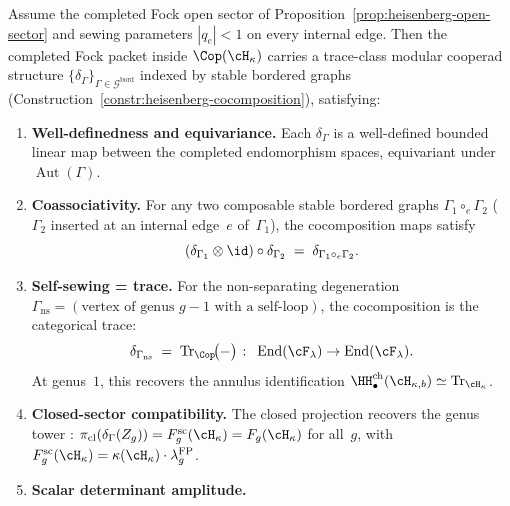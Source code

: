 \begin{theorem}
\label{thm:heisenberg-modular-cooperad}
\label{thm:ct2-heisenberg}
Assume the completed Fock open sector of
Proposition~\ref{prop:heisenberg-open-sector} and sewing parameters
$|q_e|<1$ on every internal edge. Then the completed Fock packet inside
$\Cop(\cH_\kappa)$ carries a trace-class modular cooperad structure
$\{\delta_\Gamma\}_{\Gamma \in \mathcal{G}^{\mathrm{bord}}}$
indexed by stable bordered graphs
\textup{(}Construction~\textup{\ref{constr:heisenberg-cocomposition}}\textup{)},
satisfying:
\begin{enumerate}[label=\textup{(\Roman*)}]
\item \textbf{Well-definedness and equivariance.}
 Each $\delta_\Gamma$ is a well-defined bounded linear map between
 the completed endomorphism spaces, equivariant under
 $\operatorname{Aut}(\Gamma)$.
\item \textbf{Coassociativity.}
 For any two composable stable bordered graphs
 $\Gamma_1 \circ_e \Gamma_2$ \textup{(}$\Gamma_2$ inserted at an
 internal edge~$e$ of~$\Gamma_1$\textup{)}, the cocomposition maps
 satisfy
 \begin{equation}\label{eq:heisenberg-coassociativity}
 (\delta_{\Gamma_1} \otimes \id)
 \circ \delta_{\Gamma_2}
 \;=\;
 \delta_{\Gamma_1 \circ_e \Gamma_2}.
 \end{equation}
\item \textbf{Self-sewing = trace.}
 For the non-separating degeneration
 $\Gamma_{\mathrm{ns}} = (\text{vertex of genus } g{-}1
 \text{ with a self-loop})$, the cocomposition is the categorical
 trace:
 \begin{equation}\label{eq:heisenberg-self-sewing}
 \delta_{\Gamma_{\mathrm{ns}}}
 \;=\;
 \operatorname{Tr}_{\Cop}\!\bigl(-\bigr)
 \;\colon\;
 \operatorname{End}(\cF_\lambda)
 \to
 \operatorname{End}(\cF_\lambda).
 \end{equation}
 At genus~$1$, this recovers the annulus identification
 $\HH^{\mathrm{ch}}_\bullet(\cH_{\kappa,b}) \simeq
 \operatorname{Tr}_{\cH_\kappa}$.
\item \textbf{Closed-sector compatibility.}
 The closed projection recovers the genus tower :
 $\pi_{\mathrm{cl}}(\delta_\Gamma(Z_g))
 = F_g^{\mathrm{sc}}(\cH_\kappa)
 = F_g(\cH_\kappa)$ for all~$g$, with
 $F_g^{\mathrm{sc}}(\cH_\kappa)
 = \kappa(\cH_\kappa) \cdot \lambda_g^{\mathrm{FP}}$.
\item \textbf{Scalar determinant amplitude.}

\end{enumerate}
\end{theorem}

